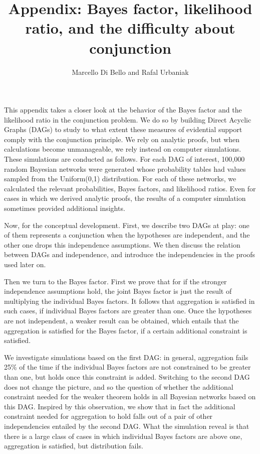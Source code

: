 \documentclass[
  10pt,
  dvipsnames,enabledeprecatedfontcommands]{scrartcl}
\title{Appendix: Bayes factor, likelihood ratio, and the difficulty
about conjunction}
\author{Marcello Di Bello and Rafal Urbaniak}
\date{}
\begin{document}
\maketitle

This appendix takes a closer look at the behavior of the Bayes factor
and the likelihood ratio in the conjunction problem. We do so by
building Direct Acyclic Graphs (DAGs) to study to what extent these
measures of evidential support comply with the conjunction principle. We
rely on analytic proofs, but when calculations become unmanageable, we
rely instead on computer simulations. These simulations are conducted as
follows. For each DAG of interest, 100,000 random Bayesian networks were
generated whose probability tables had values sampled from the
\textsf{Uniform(0,1)} distribution. For each of these networks, we
calculated the relevant probabilities, Bayes factors, and likelihood
ratios. Even for cases in which we derived analytic proofs, the results
of a computer simulation sometimes provided additional insights.

Now, for the conceptual development. First, we describe two
\textsf{DAG}s at play: one of them represents a conjunction when the
hypotheses are independent, and the other one drops this independence
assumptions. We then discuss the relation between \textsf{DAG}s and
independence, and introduce the independencies in the proofs used later
on.

Then we turn to the Bayes factor. First we prove that for if the
stronger independence assumptions hold, the joint Bayes factor is just
the result of multiplying the individual Bayes factors. It follows that
aggregation is satisfied in such cases, if individual Bayes factors are
greater than one. Once the hypotheses are not independent, a weaker
result can be obtained, which entails that the aggregation is satisfied
for the Bayes factor, if a certain additional constraint is satisfied.

We investigate simulations based on the first \textsf{DAG}: in general,
aggregation fails 25\% of the time if the individual Bayes factors are
not constrained to be greater than one, but holds once this constraint
is added. Switching to the second \textsf{DAG} does not change the
picture, and so the question of whether the additional constraint needed
for the weaker theorem holds in all Bayesian networks based on this
\textsf{DAG}. Inspired by this observation, we show that in fact the
additional constraint needed for aggregation to hold falls out of a pair
of other independencies entailed by the second \textsf{DAG}. What the
simulation reveal is that there is a large class of cases in which
individual Bayes factors are above one, aggregation is satisfied, but
distribution fails.
\end{document}
